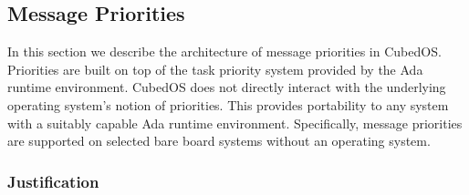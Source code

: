 
%
%

\subsection{Message Priorities}
\label{sec:architecture-message-priorities}

In this section we describe the architecture of message priorities in CubedOS. Priorities are
built on top of the task priority system provided by the Ada runtime environment. CubedOS does
not directly interact with the underlying operating system's notion of priorities. This provides
portability to any system with a suitably capable Ada runtime environment. Specifically, message
priorities are supported on selected bare board systems without an operating system.

\subsubsection{Justification}

